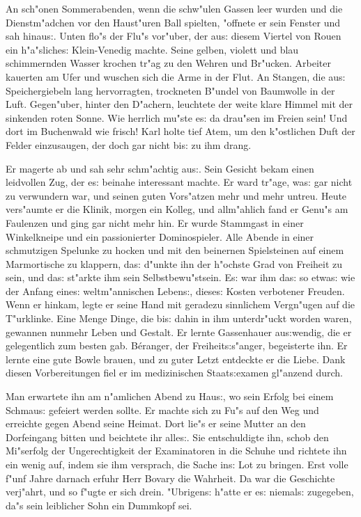 \documentclass[oneside,12pt]{book}
\newcommand{\s}{s:}%
\begin{document}
An sch"onen Sommerabenden, wenn die schw"ulen Gassen leer wurden
und die Dienstm"adchen vor den Haust"uren Ball spielten, "offnete
er sein Fenster und sah hinau{\s}. Unten flo"s der Flu"s vor"uber,
der au{\s} diesem Viertel von Rouen ein h"a"sliche{\s}
Klein-Venedig machte. Seine gelben, violett und blau schimmernden
Wasser krochen tr"ag zu den Wehren und Br"ucken. Arbeiter kauerten
am Ufer und wuschen sich die Arme in der Flut. An Stangen, die
au{\s} Speichergiebeln lang hervorragten, trockneten B"undel von
Baumwolle in der Luft. Gegen"uber, hinter den D"achern, leuchtete
der weite klare Himmel mit der sinkenden roten Sonne. Wie herrlich
mu"ste e{\s} da drau"sen im Freien sein! Und dort im Buchenwald
wie frisch! Karl holte tief Atem, um den k"ostlichen Duft der
Felder einzusaugen, der doch gar nicht bi{\s} zu ihm drang.

Er magerte ab und sah sehr schm"achtig au{\s}. Sein Gesicht bekam
einen leidvollen Zug, der e{\s} beinahe interessant machte. Er
ward tr"age, wa{\s} gar nicht zu verwundern war, und seinen guten
Vors"atzen mehr und mehr untreu. Heute vers"aumte er die Klinik,
morgen ein Kolleg, und allm"ahlich fand er Genu"s am Faulenzen und
ging gar nicht mehr hin. Er wurde Stammgast in einer Winkelkneipe
und ein passionierter Dominospieler. Alle Abende in einer
schmutzigen Spelunke zu hocken und mit den beinernen Spielsteinen
auf einem Marmortische zu klappern, da{\s} d"unkte ihn der
h"ochste Grad von Freiheit zu sein, und da{\s} st"arkte ihm sein
Selbstbewu"stsein. E{\s} war ihm da{\s} so etwa{\s} wie der Anfang
eine{\s} weltm"annischen Leben{\s}, diese{\s} Kosten verbotener
Freuden. Wenn er hinkam, legte er seine Hand mit geradezu
sinnlichem Vergn"ugen auf die T"urklinke. Eine Menge Dinge, die
bi{\s} dahin in ihm unterdr"uckt worden waren, gewannen nunmehr
Leben und Gestalt. Er lernte Gassenhauer au{\s}wendig, die er
gelegentlich zum besten gab. B\'eranger, der Freiheit{\s}s"anger,
begeisterte ihn. Er lernte eine gute Bowle brauen, und zu guter
Letzt entdeckte er die Liebe. Dank diesen Vorbereitungen fiel er
im medizinischen Staat{\s}examen gl"anzend durch.

Man erwartete ihn am n"amlichen Abend zu Hau{\s}, wo sein Erfolg
bei einem Schmau{\s} gefeiert werden sollte. Er machte sich zu
Fu"s auf den Weg und erreichte gegen Abend seine Heimat. Dort
lie"s er seine Mutter an den Dorfeingang bitten und beichtete ihr
alle{\s}. Sie entschuldigte ihn, schob den Mi"serfolg der
Ungerechtigkeit der Examinatoren in die Schuhe und richtete ihn
ein wenig auf, indem sie ihm versprach, die Sache in{\s} Lot zu
bringen. Erst volle f"unf Jahre darnach erfuhr Herr Bovary die
Wahrheit. Da war die Geschichte verj"ahrt, und so f"ugte er sich
drein. "Ubrigen{\s} h"atte er e{\s} niemal{\s} zugegeben, da"s
sein leiblicher Sohn ein Dummkopf sei.
\end{document}
